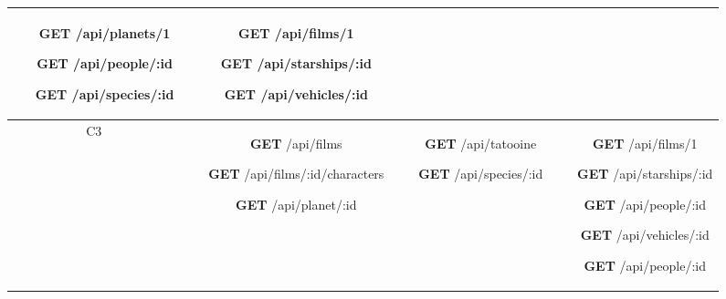 \begin{table}[H]
\begin{tabular}{|c|c|c|c|}
\begin{minipage}[t]{0.3\textwidth}
\begin{itemize}
        \item[\textbf{GET}] /api/planets/1
        \item[\textbf{GET}] /api/people/:id
        \item[\textbf{GET}] /api/species/:id
      \end{itemize}
    \end{minipage} & \begin{minipage}[t]{0.3\textwidth}
      \begin{itemize}
        \item[\textbf{GET}] /api/films/1
        \item[\textbf{GET}] /api/starships/:id
        \item[\textbf{GET}] /api/vehicles/:id
      \end{itemize}
    \end{minipage} \\
    \hline
    C3 & \begin{minipage}[t]{0.3\textwidth}
      \begin{itemize}
        \item[\textbf{GET}] /api/films
        \item[\textbf{GET}] /api/films/:id/characters
        \item[\textbf{GET}] /api/planet/:id
      \end{itemize}
    \end{minipage} & \begin{minipage}[t]{0.3\textwidth}
      \begin{itemize}
        \item[\textbf{GET}] /api/tatooine
        \item[\textbf{GET}] /api/species/:id
      \end{itemize}
    \end{minipage} & \begin{minipage}[t]{0.3\textwidth}
      \begin{itemize}
        \item[\textbf{GET}] /api/films/1
        \item[\textbf{GET}] /api/starships/:id
        \item[\textbf{GET}] /api/people/:id
        \item[\textbf{GET}] /api/vehicles/:id
        \item[\textbf{GET}] /api/people/:id
      \end{itemize}
    \end{minipage} \\

\end{tabular}
\end{table}
